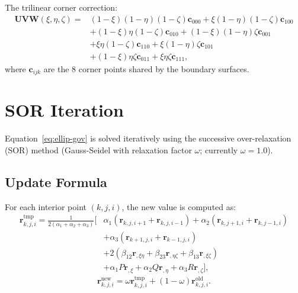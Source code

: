 \documentclass[11pt,a4paper]{report}
\newcommand{\rvec}{\bm{r}}
\begin{document}
The trilinear corner correction:
\begin{equation}
\begin{split}
    \bm{UVW}(\xi, \eta, \zeta) = & (1-\xi)(1-\eta)(1-\zeta)\bm{c}_{000} + \xi(1-\eta)(1-\zeta)\bm{c}_{100} \\
    & + (1-\xi)\eta(1-\zeta)\bm{c}_{010} + (1-\xi)(1-\eta)\zeta\bm{c}_{001} \\
    & + \xi\eta(1-\zeta)\bm{c}_{110} + \xi(1-\eta)\zeta\bm{c}_{101} \\
    & + (1-\xi)\eta\zeta\bm{c}_{011} + \xi\eta\zeta\bm{c}_{111},
\end{split}
\end{equation}
where $\bm{c}_{ijk}$ are the 8 corner points shared by the boundary surfaces.

\section{SOR Iteration}

Equation~\eqref{eq:ellip-gov} is solved iteratively using the successive over-relaxation (SOR) method (Gauss-Seidel with relaxation factor $\omega$; currently $\omega = 1.0$).

\subsection{Update Formula}

For each interior point $(k, j, i)$, the new value is computed as:
\begin{equation}
\begin{split}
    \rvec_{k,j,i}^{\text{tmp}} = \frac{1}{2(\alpha_1 + \alpha_2 + \alpha_3)} \bigg[
        & \alpha_1(\rvec_{k,j,i+1} + \rvec_{k,j,i-1}) + \alpha_2(\rvec_{k,j+1,i} + \rvec_{k,j-1,i}) \\
        & + \alpha_3(\rvec_{k+1,j,i} + \rvec_{k-1,j,i}) \\
        & + 2(\beta_{12}\rvec_{,\xi\eta} + \beta_{23}\rvec_{,\eta\zeta} + \beta_{13}\rvec_{,\xi\zeta}) \\
        & + \alpha_1 P \rvec_{,\xi} + \alpha_2 Q \rvec_{,\eta} + \alpha_3 R \rvec_{,\zeta} \bigg],
\end{split}
\end{equation}
\begin{equation}
    \rvec_{k,j,i}^{\text{new}} = \omega \rvec_{k,j,i}^{\text{tmp}} + (1-\omega) \rvec_{k,j,i}^{\text{old}}.
\end{equation}
\end{document}
